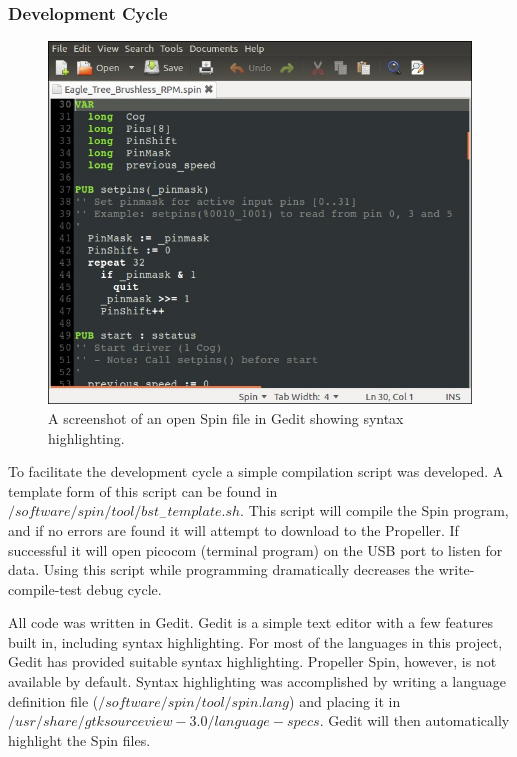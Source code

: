 \documentclass{article}
\numberwithin{equation}{section} %
\begin{document}
\subsubsection{Development Cycle}

\begin{figure}[h!]
  \centering
	\includegraphics[scale=.4]{gedit_spin_screenshot.jpg}
  \caption{A screenshot of an open Spin file in Gedit showing syntax highlighting.}
\end{figure}  
 
To facilitate the development cycle a simple compilation script was developed. A template form of this script can be found in \\ $/software/spin/tool/bst_-template.sh$. This script will compile the Spin program, and if no errors are found it will attempt to download to the Propeller. If successful it will open picocom (terminal program) on the USB port to listen for data. Using this script while programming dramatically decreases the write-compile-test debug cycle.



All code was written in Gedit. Gedit is a simple text editor with a few features built in, including syntax highlighting. For most of the languages in this project, Gedit has provided suitable syntax highlighting. Propeller Spin, however, is not available by default. Syntax highlighting was accomplished by writing a language definition file ($/software/spin/tool/spin.lang$) and placing it in $/usr/share/gtksourceview-3.0/language-specs$. Gedit will then automatically highlight the Spin files.
\end{document}
